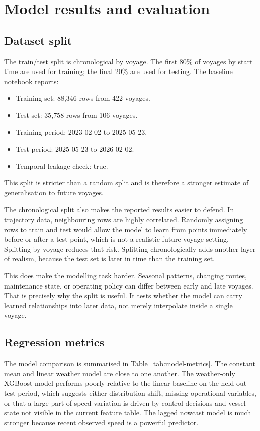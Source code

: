 \documentclass[10pt,a4paper]{article}
\begin{document}
\section{Model results and evaluation}

\subsection{Dataset split}

The train/test split is chronological by voyage. The first 80\% of voyages by
start time are used for training; the final 20\% are used for testing. The
baseline notebook reports:

\begin{itemize}
    \item Training set: 88,346 rows from 422 voyages.
    \item Test set: 35,758 rows from 106 voyages.
    \item Training period: 2023-02-02 to 2025-05-23.
    \item Test period: 2025-05-23 to 2026-02-02.
    \item Temporal leakage check: true.
\end{itemize}

This split is stricter than a random split and is therefore a stronger estimate
of generalisation to future voyages.

The chronological split also makes the reported results easier to defend. In
trajectory data, neighbouring rows are highly correlated. Randomly assigning
rows to train and test would allow the model to learn from points immediately
before or after a test point, which is not a realistic future-voyage setting.
Splitting by voyage reduces that risk. Splitting chronologically adds another
layer of realism, because the test set is later in time than the training set.

This does make the modelling task harder. Seasonal patterns, changing routes,
maintenance state, or operating policy can differ between early and late
voyages. That is precisely why the split is useful. It tests whether the model
can carry learned relationships into later data, not merely interpolate inside a
single voyage.

\subsection{Regression metrics}

The model comparison is summarised in Table~\ref{tab:model-metrics}. The
constant mean and linear weather model are close to one another. The weather-only
XGBoost model performs poorly relative to the linear baseline on the held-out
test period, which suggests either distribution shift, missing operational
variables, or that a large part of speed variation is driven by control decisions
and vessel state not visible in the current feature table. The lagged nowcast
model is much stronger because recent observed speed is a powerful predictor.
\end{document}
